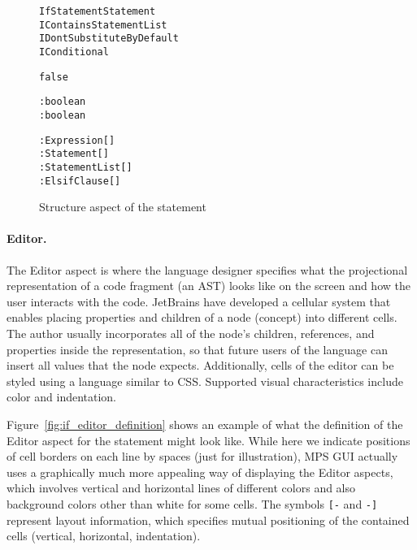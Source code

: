 \begin{figure}[ht]
\vspace{-2mm}
\centering
\begin{alltt}
\small
{} IfStatement  Statement
         IContainsStatementList
                   IDontSubstituteByDefault
                   IConditional

   false
   
   

     : boolean
   : boolean
  
          : Expression[]
   : Statement[]
             : StatementList[]
       : ElsifClause[]
  
\end{alltt}
\caption{Structure aspect of the  statement}
\label{fig:if_statement_structure}
\vspace{-4mm}
\end{figure}

\paragraph{Editor.}
The Editor aspect is where the language designer specifies what the projectional representation of a code fragment (an AST) looks like on the screen and how the user interacts with the code.
JetBrains have developed a cellular system that enables placing properties and children of a node (concept) into different cells.
The author usually incorporates all of the node's children, references, and properties inside the representation, so that future users of the language can insert all values that the node expects.
Additionally, cells of the editor can be styled using a language similar to CSS.
Supported visual characteristics include color and indentation.

Figure~\ref{fig:if_editor_definition} shows an example of what the definition of the Editor aspect for the  statement might look like.
While here we indicate positions of cell borders on each line by spaces (just for illustration), MPS GUI actually uses a graphically much more appealing way of displaying the Editor aspects, which involves vertical and horizontal lines of different colors and also background colors other than white for some cells.
The symbols \verb|[-| and \verb|-]| represent layout information, which specifies mutual positioning of the contained cells (vertical, horizontal, indentation).

